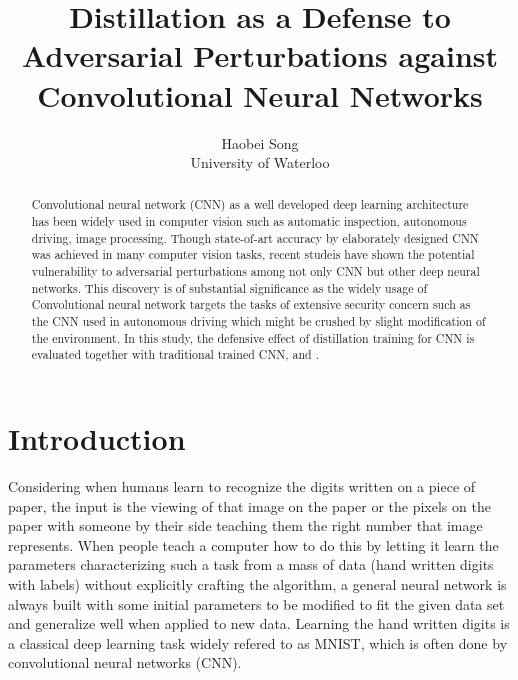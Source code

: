 \documentclass{article}
\title{Distillation as a Defense to Adversarial Perturbations against Convolutional Neural Networks}
\author{Haobei Song \\
        University of Waterloo}
\begin{document}
\maketitle
{}
\newpage
{}

\begin{abstract}
	Convolutional neural network (CNN) as a well developed deep learning architecture has been widely used in computer vision such as automatic inspection, autonomous driving, image processing. 
	Though state-of-art accuracy by elaborately designed CNN was achieved in many computer vision tasks, 
	recent studeis have shown the potential vulnerability to adversarial perturbations among not only CNN but other deep neural networks.
	This discovery is of substantial significance as the widely usage of Convolutional neural network targets the tasks of extensive security concern
	such as the CNN used in autonomous driving which might be crushed by slight modification of the environment. 
	In this study, the defensive effect of distillation training for CNN is evaluated together with traditional trained CNN, and .
\end{abstract}
\section{Introduction}
Considering when humans learn to recognize the digits written on a piece of paper, the input is the viewing of that image on the paper or the pixels on the paper with someone by their side teaching them the right number that image represents.
When people teach a computer how to do this by letting it learn the parameters characterizing such a task from a mass of data (hand written digits with labels) without explicitly crafting the algorithm, 
a general neural network is always built with some initial parameters to be modified to fit the given data set and generalize well when applied to new data. Learning the hand written digits is a classical deep learning task widely refered to as MNIST, which is often done by convolutional neural networks (CNN).
\end{document}
